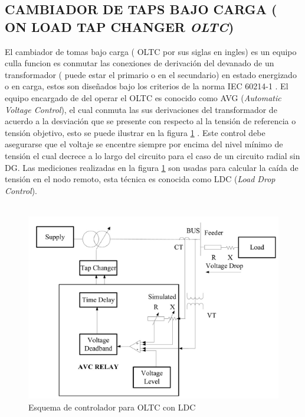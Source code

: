 \documentclass[12pt, letterpaper]{report}
\begin{document}
\subsection{CAMBIADOR DE TAPS BAJO CARGA ( ON LOAD TAP CHANGER \textit{OLTC})}
El cambiador de tomas bajo carga ( OLTC por sus siglas en ingles) es un equipo  culla funcion es conmutar las conexiones de derivación del devanado de un transformador ( puede estar el primario o en el secundario) en estado energizado o en carga, estos son diseñados bajo los criterios de la norma IEC 60214-1 \cite{IEC60214}.
El equipo encargado de del operar el OLTC es conocido como AVG (\textit{Automatic Voltage Control}), el cual conmuta las sus derivaciones del transformador de acuerdo a la desviación que se presente con respecto al la tensión de referencia o tensión objetivo, esto se puede ilustrar en la figura \ref{fig:esqusema_LDC} \cite{Sarimuthu2016}. Este control debe asegurarse que el voltaje se encentre siempre por encima del nivel mínimo de tensión el cual decrece a lo largo del circuito \cite{Sarimuthu2016} para el caso de un circuito radial sin DG. Las  mediciones realizadas en la figura \ref{fig:esqusema_LDC} son usadas para calcular la caída de tensión en el nodo remoto, esta técnica es conocida como LDC (\textit{Load Drop Control}).\\\\

\begin{figure}[h]
\centering
\caption{Esquema de controlador para OLTC con LDC \cite{Sarimuthu2016}}
\label{fig:esqusema_LDC}
\includegraphics[width=0.7\linewidth]{imagenes/cap_2/LDC}
\end{figure}
\end{document}
